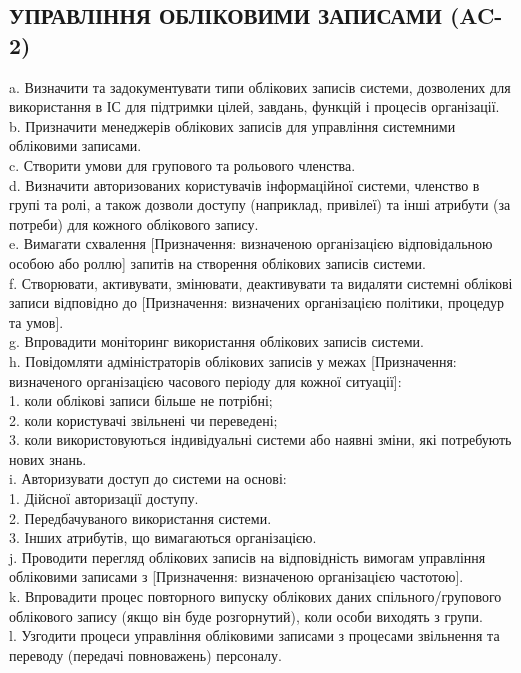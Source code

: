 \documentclass{article}
\begin{document}
\subsection{УПРАВЛІННЯ ОБЛІКОВИМИ ЗАПИСАМИ (AC-2)}
a. Визначити та задокументувати типи облікових записів системи, дозволених для використання в ІС для підтримки цілей, завдань, функцій і процесів організації.\\ 
b. Призначити менеджерів облікових записів для управління системними обліковими записами.\\ 
c. Створити умови для групового та рольового членства.\\ 
d. Визначити авторизованих користувачів інформаційної системи, членство в групі та ролі, а також дозволи доступу (наприклад, привілеї) та інші атрибути (за потреби) для кожного облікового запису.\\ 
e. Вимагати схвалення [Призначення: визначеною організацією відповідальною особою або роллю] запитів на створення облікових записів системи.\\ 
f. Створювати, активувати, змінювати, деактивувати та видаляти системні облікові записи відповідно до [Призначення: визначених організацією політики, процедур та умов].\\ 
g. Впровадити моніторинг використання облікових записів системи.\\ 
h. Повідомляти адміністраторів облікових записів у межах [Призначення: визначеного організацією часового періоду для кожної ситуації]:\\ 
1. коли облікові записи більше не потрібні;\\ 
2. коли користувачі звільнені чи переведені;\\ 
3. коли використовуються індивідуальні системи або наявні зміни, які потребують нових знань.\\ 
i. Авторизувати доступ до системи на основі:\\ 
1. Дійсної авторизації доступу.\\ 
2. Передбачуваного використання системи.\\ 
3. Інших атрибутів, що вимагаються організацією.\\ 
j. Проводити перегляд облікових записів на відповідність вимогам управління обліковими записами з [Призначення: визначеною організацією частотою].\\ 
k. Впровадити процес повторного випуску облікових даних спільного/групового облікового запису (якщо він буде розгорнутий), коли особи виходять з групи.\\ 
l. Узгодити процеси управління обліковими записами з процесами звільнення та переводу (передачі повноважень) персоналу.
\end{document}
